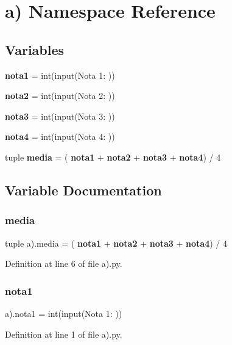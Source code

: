 \section{a) Namespace Reference}
\label{namespacea_08}
\subsection*{Variables}
\begin{DoxyCompactItemize}
\item 
\textbf{ nota1} = int(input(\textquotesingle{}Nota 1\+: \textquotesingle{}))
\item 
\textbf{ nota2} = int(input(\textquotesingle{}Nota 2\+: \textquotesingle{}))
\item 
\textbf{ nota3} = int(input(\textquotesingle{}Nota 3\+: \textquotesingle{}))
\item 
\textbf{ nota4} = int(input(\textquotesingle{}Nota 4\+: \textquotesingle{}))
\item 
tuple \textbf{ media} = (\textbf{ nota1} + \textbf{ nota2} + \textbf{ nota3} + \textbf{ nota4}) / 4
\end{DoxyCompactItemize}


\subsection{Variable Documentation}
\mbox{\label{namespacea_08_ade76e219132f3a21cef20b84996d38b7}} 
\subsubsection{media}
{\footnotesize\ttfamily tuple a).media = (\textbf{ nota1} + \textbf{ nota2} + \textbf{ nota3} + \textbf{ nota4}) / 4}



Definition at line 6 of file a).\+py.

\mbox{\label{namespacea_08_ab70bce5178e3faa81ad7e1b75cffcd74}} 
\subsubsection{nota1}
{\footnotesize\ttfamily a).nota1 = int(input(\textquotesingle{}Nota 1\+: \textquotesingle{}))}



Definition at line 1 of file a).\+py.

\mbox{\label{namespacea_08_aa4978aec05e2c8e76acd33c1fed171e9}} 
